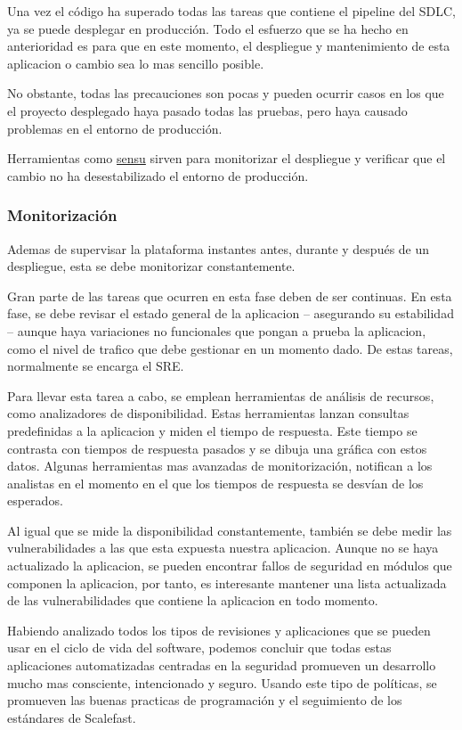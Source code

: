 \documentclass[12pt]{report} %
\begin{document}
Una vez el código ha superado todas las tareas que contiene el \gls{pipeline}
del \gls{SDLC}, ya se puede desplegar en producción.
Todo el esfuerzo que se ha hecho en anterioridad es para que en este momento, el
despliegue y mantenimiento de esta aplicacion o cambio sea lo mas sencillo
posible.

No obstante, todas las precauciones son pocas y pueden ocurrir casos en los que
el proyecto desplegado haya pasado todas las pruebas, pero haya causado
problemas en el entorno de producción.

Herramientas como \href{https://sensu.io/}{sensu} sirven para monitorizar el
despliegue y verificar que el cambio no ha desestabilizado el entorno de
producción.

\subsubsection{Monitorización} \label{monitorizacion}

Ademas de supervisar la plataforma instantes antes, durante y después de un
despliegue, esta se debe monitorizar constantemente.

Gran parte de las tareas que ocurren en esta fase deben de ser continuas.
En esta fase, se debe revisar el estado general de la aplicacion -- asegurando
su estabilidad -- aunque haya variaciones no funcionales que pongan a prueba la
aplicacion, como el nivel de trafico que debe gestionar en un momento dado.
De estas tareas, normalmente se encarga el \acrfull{SRE}.

Para llevar esta tarea a cabo, se emplean herramientas de análisis de recursos,
como analizadores de disponibilidad.
Estas herramientas lanzan consultas predefinidas a la aplicacion y miden el
tiempo de respuesta.
Este tiempo se contrasta con tiempos de respuesta pasados y se dibuja una
gráfica con estos datos.
Algunas herramientas mas avanzadas de monitorización, notifican a los analistas
en el momento en el que los tiempos de respuesta se desvían de los esperados.

Al igual que se mide la disponibilidad constantemente, también se debe medir las
vulnerabilidades a las que esta expuesta nuestra aplicacion.
Aunque no se haya actualizado la aplicacion, se pueden encontrar fallos de
seguridad en módulos que componen la aplicacion, por tanto, es interesante
mantener una lista actualizada de las vulnerabilidades que contiene la
aplicacion en todo momento.

Habiendo analizado todos los tipos de revisiones y aplicaciones que se pueden
usar en el ciclo de vida del software, podemos concluir que todas estas
aplicaciones automatizadas centradas en la seguridad promueven un desarrollo
mucho mas consciente, intencionado y seguro.  Usando este tipo de políticas, se
promueven las buenas practicas de programación y el seguimiento de los
estándares de Scalefast.
\end{document}
